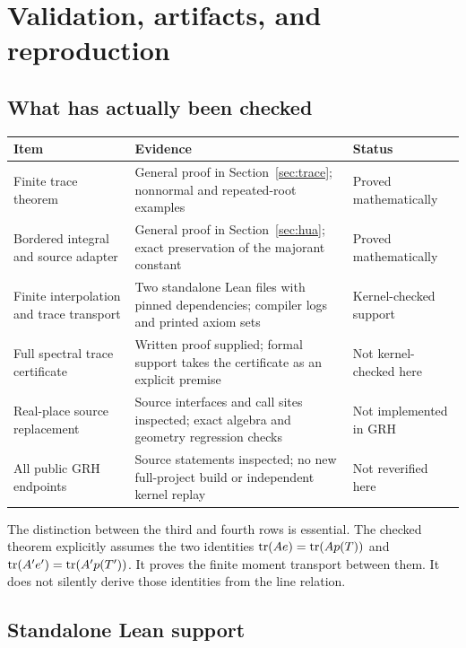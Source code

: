 \clearpage
\section{Validation, artifacts, and reproduction}\label{sec:validation}

\subsection{What has actually been checked}

\begin{center}
\begin{tabularx}{\linewidth}{@{}L{.28\linewidth}YL{.20\linewidth}@{}}
\toprule
Item & Evidence & Status\\
\midrule
Finite trace theorem & General proof in Section~\ref{sec:trace}; nonnormal and repeated-root examples & Proved mathematically\\
Bordered integral and source adapter & General proof in Section~\ref{sec:hua}; exact preservation of the majorant constant & Proved mathematically\\
Finite interpolation and trace transport & Two standalone Lean files with pinned dependencies; compiler logs and printed axiom sets & Kernel-checked support\\
Full spectral trace certificate & Written proof supplied; formal support takes the certificate as an explicit premise & Not kernel-checked here\\
Real-place source replacement & Source interfaces and call sites inspected; exact algebra and geometry regression checks & Not implemented in GRH\\
All public GRH endpoints & Source statements inspected; no new full-project build or independent kernel replay & Not reverified here\\
\bottomrule
\end{tabularx}
\end{center}

The distinction between the third and fourth rows is essential. The checked
theorem  explicitly assumes
the two identities \(\operatorname{tr}(Ae)=\operatorname{tr}(Ap(T))\) and
\(\operatorname{tr}(A'e')=\operatorname{tr}(A'p(T'))\). It proves the finite moment transport between them.
It does not silently derive those identities from the line relation.

\subsection{Standalone Lean support}

